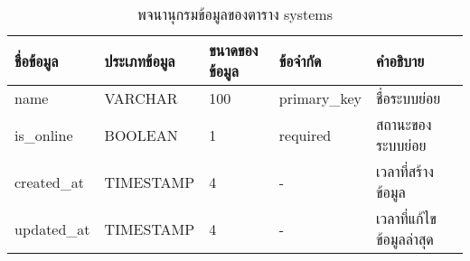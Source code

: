 \begin{table}[htbp]
    \caption{พจนานุกรมข้อมูลของตาราง systems}
    \label{tab:database-systems}
    \begin{tabularx}{\textwidth}{ | p{2.25cm} | p{2.20cm} | p{2.45cm} | p{2cm} | X | }
    \hline
    \textbf{ชื่อข้อมูล} & \textbf{ประเภทข้อมูล} & \textbf{ขนาดของข้อมูล} & \textbf{ข้อจำกัด} & \textbf{คำอธิบาย} \\
    \hline
    name & VARCHAR & 100 & primary\_key & ชื่อระบบย่อย \\
    \hline
    is\_online & BOOLEAN & 1 & required & สถานะของระบบย่อย \\
    \hline
    created\_at & TIMESTAMP & 4 & - & เวลาที่สร้างข้อมูล \\
    \hline
    updated\_at & TIMESTAMP & 4 & - & เวลาที่แก้ไขข้อมูลล่าสุด \\
    \hline
    \end{tabularx}
\end{table}
